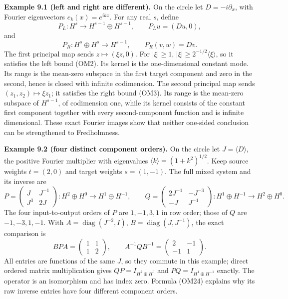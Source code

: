 \documentclass[
  11pt,
]{article}
\begin{document}
\textbf{Example 9.1 (left and right are different).} On the circle let
\(D=-i\partial_x\), with Fourier eigenvectors \(e_k(x)=e^{ikx}\). For
any real \(s\), define \[
 P_L:H^s\longrightarrow H^{s-1}\oplus H^{s-1},
 \qquad P_Lu=(Du,0),
 \tag{OM31}
\] and \[
 P_R:H^s\oplus H^s\longrightarrow H^{s-1},
 \qquad P_R(v,w)=Dv.
 \tag{OM32}
\] The first principal map sends \(z\mapsto(\xi z,0)\). For
\(|\xi|\ge1\), \(|\xi|\ge2^{-1/2}\langle\xi\rangle\), so it satisfies
the left bound (OM2). Its kernel is the one-dimensional constant mode.
Its range is the mean-zero subspace in the first target component and
zero in the second, hence is closed with infinite codimension. The
second principal map sends \((z_1,z_2)\mapsto\xi z_1\); it satisfies the
right bound (OM3). Its range is the mean-zero subspace of \(H^{s-1}\),
of codimension one, while its kernel consists of the constant first
component together with every second-component function and is infinite
dimensional. These exact Fourier images show that neither one-sided
conclusion can be strengthened to Fredholmness.

\textbf{Example 9.2 (four distinct component orders).} On the circle let
\(J=\langle D\rangle\), the positive Fourier multiplier with eigenvalues
\(\langle k\rangle=(1+k^2)^{1/2}\). Keep source weights \(t=(2,0)\) and
target weights \(s=(1,-1)\). The full mixed system and its inverse are
\[
 P=
 \begin{pmatrix}
 J&J^{-1}\\ J^3&2J
 \end{pmatrix}:
 H^2\oplus H^0\longrightarrow H^1\oplus H^{-1},
 \qquad
 Q=
 \begin{pmatrix}
 2J^{-1}&-J^{-3}\\ -J&J^{-1}
 \end{pmatrix}:
 H^1\oplus H^{-1}\longrightarrow H^2\oplus H^0.
 \tag{OM33}
\] The four input-to-output orders of \(P\) are \(1,-1,3,1\) in row
order; those of \(Q\) are \(-1,-3,1,-1\). With
\(A=\operatorname{diag}(J^{-2},I)\),
\(B=\operatorname{diag}(J,J^{-1})\), the exact comparison is \[
 BPA=\begin{pmatrix}1&1\\1&2\end{pmatrix},
 \qquad
 A^{-1}QB^{-1}
     =\begin{pmatrix}2&-1\\-1&1\end{pmatrix}.
 \tag{OM34}
\] All entries are functions of the same \(J\), so they commute in this
example; direct ordered matrix multiplication gives
\(QP=I_{H^2\oplus H^0}\) and \(PQ=I_{H^1\oplus H^{-1}}\) exactly. The
operator is an isomorphism and has index zero. Formula (OM24) explains
why its raw inverse entries have four different component orders.
\end{document}

